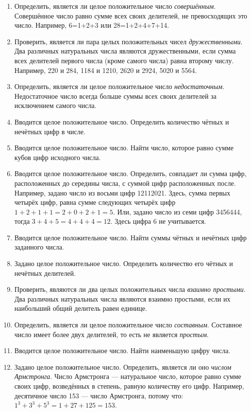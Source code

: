 \begin{enumerate}
\item Определить, является ли целое положительное число \emph{совершённым}. Совершённое число равно сумме
всех своих делителей, не превосходящих это число. Например, 6=1+2+3 или 28=1+2+4+7+14.
\item Проверить, является ли пара целых положительных чисел \emph{дружественными}. Два различных натуральных
числа являются дружественными, если сумма всех делителей первого числа (кроме самого числа) равна второму числу.
Например, 220 и 284, 1184 и 1210, 2620 и 2924, 5020 и 5564.
\item Определить, является ли целое положительное число \emph{недостаточным}. Недостаточное число всегда
больше суммы всех своих делителей за исключением самого числа.
\item Вводится целое положительное число. Определить количество чётных и нечётных цифр в числе.
\item Вводится целое положительное число. Найти число, которое равно сумме кубов цифр исходного числа.
\item Вводится целое положительное число. Определить, совпадает ли сумма цифр, 
расположенных до середины числа, с суммой цифр расположенных после. Например, задано число из восьми 
цифр 12112021. Здесь, сумма первых четырёх цифр, равна сумме следующих четырёх цифр $1+2+1+1=2+0+2+1=5$. 
Или, задано число из семи цифр 3456444, тогда $3+4+5=4+4+4=12$. Здесь цифра 6 не учитывается.
\item Вводится целое положительное число. Найти суммы чётных и нечётных цифр заданного числа.
\item Задано целое положительное число. Определить количество его чётных и нечётных делителей.
\item Проверить, являются ли два целых положительных числа \emph{взаимно простыми}. Два различных
натуральных числа являются взаимно простыми, если их наибольший общий делитель равен единице.
\item Определить, является ли целое положительное число \emph{составным}. Составное число имеет более двух
делителей, то есть не является \emph{простым}.
\item Вводится целое положительное число. Найти наименьшую цифру числа.
\item Задано целое положительное число. Определить, является ли оно \emph{числом Армстронга}. Число
Армстронга --- натуральное число, которое равно сумме своих цифр, возведённых в степень, равную количеству его цифр.
Например, десятичное число 153 --- число Армстронга, потому что:  $1^3+3^3+5^3=1+27+125=153$.

\end{enumerate}
